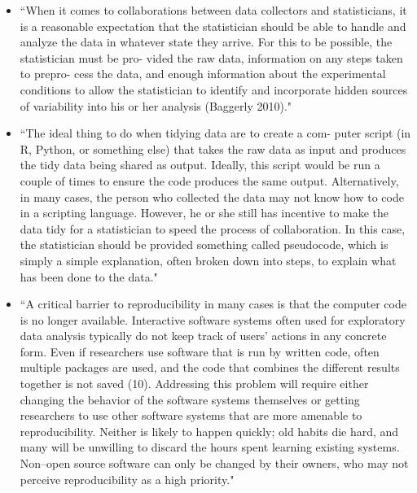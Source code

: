\documentclass[pdftex,english,11pt,parskip=half]{scrartcl}
\begin{document}
\begin{itemize}
\item ``When it comes to collaborations between data collectors and statisticians, it is a reasonable expectation that the statistician should be able to handle and analyze the data in whatever state they arrive. For this to be possible, the statistician must be pro- vided the raw data, information on any steps taken to prepro- cess the data, and enough information about the experimental conditions to allow the statistician to identify and incorporate hidden sources of variability into his or her analysis (Baggerly 2010)." \cite{ellis2018share} 
\item ``The ideal thing to do when tidying data are to create a com- puter script (in R, Python, or something else) that takes the raw data as input and produces the tidy data being shared as output. Ideally, this script would be run a couple of times to ensure the code produces the same output. Alternatively, in many cases, the person who collected the data may not know how to code in a scripting language. However, he or she still has incentive to make the data tidy for a statistician to speed the process of collaboration. In this case, the statistician should be provided something called pseudocode, which is simply a simple explanation, often broken down into steps, to explain what has been done to the data." \cite{ellis2018share}
\item ``A critical barrier to reproducibility in many
cases is that the computer code is no longer available.
Interactive software systems often used for
exploratory data analysis typically do not keep
track of users’ actions in any concrete form. Even
if researchers use software that is run by written
code, often multiple packages are used, and the
code that combines the different results together
is not saved (10). Addressing this problem will
require either changing the behavior of the software
systems themselves or getting researchers
to use other software systems that are more amenable
to reproducibility. Neither is likely to happen
quickly; old habits die hard, and many will
be unwilling to discard the hours spent learning
existing systems. Non–open source software can
only be changed by their owners, who may not
perceive reproducibility as a high priority." \cite{peng2011reproducible}

\end{itemize}
\end{document}
